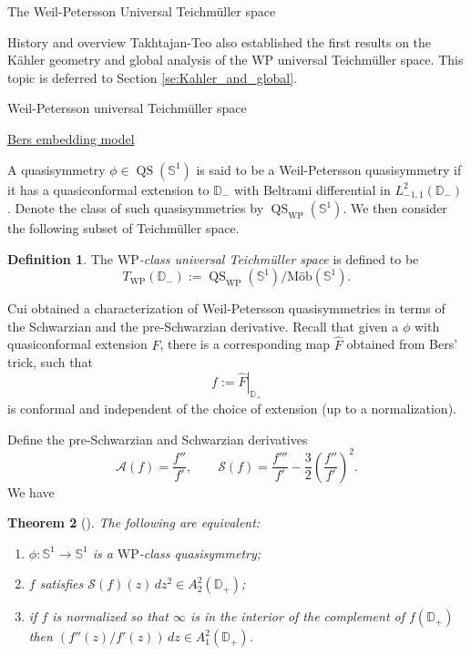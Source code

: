 \documentclass[12pt]{amsart}
\newcommand{\disk}{\ensuremath{\mathbb{D}} } %
\newcommand{\qs}{\operatorname{QS}}
\theoremstyle{plain}
\newtheorem{theorem}{Theorem}[section]
\theoremstyle{definition}
\newtheorem{definition}[theorem]{Definition}
\theoremstyle{remark}
\numberwithin{equation}{section} %
\numberwithin{figure}{section} %
\begin{document}
\begin{section}{The Weil-Petersson Universal Teichm\"uller space}
\begin{subsection}{History and overview}
Takhtajan-Teo also established the first results on the K\"ahler geometry and global analysis of the WP universal Teichm\"uller space. This topic is deferred to Section \ref{se:Kahler_and_global}. 
\end{subsection}
\begin{subsection}{Weil-Petersson universal Teichm\"uller space}
\label{se:WP_universal_Cui_Takhtajan} 
  
\begin{subsubsection}{\underline{Bers embedding model}}
   
 A quasisymmetry $\phi \in \qs(\mathbb{S}^1)$ is said to be a Weil-Petersson quasisymmetry if it has a quasiconformal extension to $\disk_-$ with Beltrami differential in $L^2_{-1,1}(\disk_-)$.  Denote the class of such quasisymmetries by $\qs_{\mathrm{WP}}(\mathbb{S}^1)$.
 We then consider the following subset of Teichm\"uller space.
\begin{definition}  \label{de:WP_univ}
   The{\it{ $\mathrm{WP}$-class universal Teichm\"uller space}} is defined to be
    \[  T_{\mathrm{WP}}(\disk_-) := \qs_{\mathrm{WP}}(\mathbb{S}^1)/\text{M\"ob}(\mathbb{S}^1).  \] 
\end{definition}
 Cui obtained a characterization of Weil-Petersson quasisymmetries in terms of the Schwarzian and the pre-Schwarzian derivative. 
 Recall that given a $\phi$ with quasiconformal extension $F$, there is a corresponding map $\hat{F}$ obtained from Bers' trick, such that 
 \begin{equation} \label{eq:Bers_trick_temp}
   f := \left. \hat{F} \right|_{\disk_+} 
 \end{equation} 
 is conformal and independent of the choice of extension (up to a  normalization).  

 Define the pre-Schwarzian and Schwarzian derivatives 
 \[  \mathcal{A}(f)=\frac{f''}{f'}, \ \ \ \ \ \  \ \ \ \mathcal{S}(f) =\frac{f'''}{f'} - \frac{3}{2} \left( \frac{f''}{f'} \right)^2.  \]
 We have
 \begin{theorem}[\cite{Cui,Takhtajan_Teo_Memoirs}] \label{th:WP_quasisymmetry_characterize}
  The following are equivalent:
  \begin{enumerate}[font=\upshape]
  \item  $\phi:\mathbb{S}^1 \rightarrow \mathbb{S}^1$ is a $\mathrm{WP}$-class quasisymmetry;
  \item $f$ satisfies $\mathcal{S}(f)(z)\,dz^2 \in A_2^2(\disk_+)$;
  \item if $f$ is normalized so that $\infty$ is in the interior of the complement of $f(\disk_+)$ then $(f''(z)/f'(z))\, dz \in A_1^2(\disk_+)$. 
  \end{enumerate}
 \end{theorem}


\end{subsubsection}
\end{subsection}
\end{section}
\end{document}
